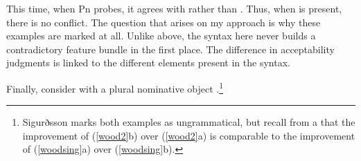 \documentclass[output=paper]{langscibook}
\begin{document}
This time, when Pn probes, it agrees with \sti rather than . Thus, when \sti is present, there is no conflict. The question that arises on my approach is why these examples are marked at all. Unlike above, the syntax here never builds a contradictory feature bundle in the first place. The difference in acceptability judgments is linked to the different elements present in the syntax.


Finally, consider  \sti with a plural nominative object \citep[33]{SigurTHsson:1996va}.\footnote{Sigurðsson marks both examples as ungrammatical, but recall from a that the improvement of (\ref{wood2}b) over (\ref{wood2}a) is comparable to the improvement of (\ref{woodsing}a) over (\ref{woodsing}b).}


\ea {}\label{wood2} 

    \z
\z
\end{document}
